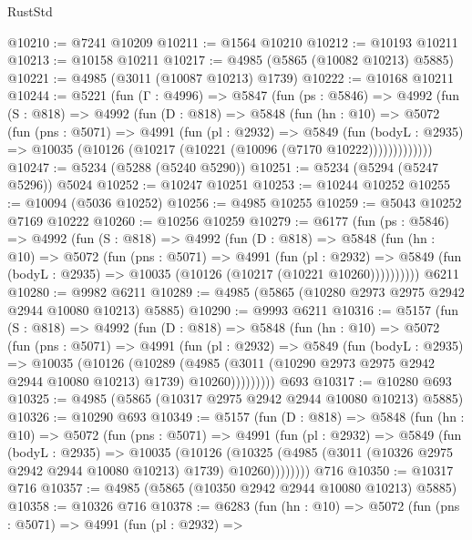 \begin{lexlean}{RustStd}
\begin{coremodule}
@10210 := @7241 @10209
@10211 := @1564 @10210
@10212 := @10193 @10211
@10213 := @10158 @10211
@10217 := @4985 (@5865 (@10082 @10213) @5885)
@10221 := @4985 (@3011 (@10087 @10213) @1739)
@10222 := @10168 @10211
@10244 := @5221
    (fun (Γ : @4996) =>
    @5847
      (fun (ps : @5846) =>
      @4992
        (fun (S : @818) =>
        @4992
          (fun (D : @818) =>
          @5848
            (fun (hn : @10) =>
            @5072
              (fun (pns : @5071) =>
              @4991
                (fun (pl : @2932) =>
                @5849
                  (fun (bodyL : @2935) =>
                  @10035 (@10126 (@10217 (@10221 (@10096 (@7170 @10222)))))))))))))
@10247 := @5234 (@5288 (@5240 @5290))
@10251 := @5234 (@5294 (@5247 @5296)) @5024
@10252 := @10247 @10251
@10253 := @10244 @10252
@10255 := @10094 (@5036 @10252)
@10256 := @4985 @10255
@10259 := @5043 @10252 @7169 @10222
@10260 := @10256 @10259
@10279 := @6177
    (fun (ps : @5846) =>
    @4992
      (fun (S : @818) =>
      @4992
        (fun (D : @818) =>
        @5848
          (fun (hn : @10) =>
          @5072
            (fun (pns : @5071) =>
            @4991
              (fun (pl : @2932) =>
              @5849 (fun (bodyL : @2935) => @10035 (@10126 (@10217 (@10221 @10260))))))))))
    @6211
@10280 := @9982 @6211
@10289 := @4985 (@5865 (@10280 @2973 @2975 @2942 @2944 @10080 @10213) @5885)
@10290 := @9993 @6211
@10316 := @5157
    (fun (S : @818) =>
    @4992
      (fun (D : @818) =>
      @5848
        (fun (hn : @10) =>
        @5072
          (fun (pns : @5071) =>
          @4991
            (fun (pl : @2932) =>
            @5849
              (fun (bodyL : @2935) =>
              @10035
                (@10126
                  (@10289
                    (@4985
                      (@3011 (@10290 @2973 @2975 @2942 @2944 @10080 @10213) @1739)
                      @10260)))))))))
    @693
@10317 := @10280 @693
@10325 := @4985 (@5865 (@10317 @2975 @2942 @2944 @10080 @10213) @5885)
@10326 := @10290 @693
@10349 := @5157
    (fun (D : @818) =>
    @5848
      (fun (hn : @10) =>
      @5072
        (fun (pns : @5071) =>
        @4991
          (fun (pl : @2932) =>
          @5849
            (fun (bodyL : @2935) =>
            @10035
              (@10126
                (@10325 (@4985 (@3011 (@10326 @2975 @2942 @2944 @10080 @10213) @1739) @10260))))))))
    @716
@10350 := @10317 @716
@10357 := @4985 (@5865 (@10350 @2942 @2944 @10080 @10213) @5885)
@10358 := @10326 @716
@10378 := @6283
    (fun (hn : @10) =>
    @5072
      (fun (pns : @5071) =>
      @4991
        (fun (pl : @2932) =>

\end{coremodule}
\end{lexlean}
